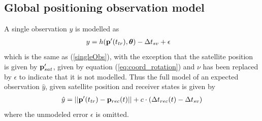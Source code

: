 \subsection{Global positioning observation model}
A single observation $y$ is modelled as 
\begin{align}
y&=h({\bf p}'(t_{tr}), {\boldsymbol \theta})-\Delta t_{sv}+\epsilon
\end{align}
which is the same as (\ref{singleObs}), with the exception that the satellite position is given by ${\bf p}'_{sat}$, given by equation (\ref{eq:coord_rotation}) and $\nu$ has been replaced by $\epsilon$ to indicate that it is not modelled. Thus the full model of an expected observation $\hat{y}$, given satellite position and receiver states is given by
\begin{align}\label{eq:obsModel}
\hat{y}=||{\bf p}'(t_{tr})-{\bf p}_{rec}(t)||+c\cdot(\Delta t_{rec}(t)-\Delta t_{sv})
\end{align}
where the unmodeled error $\epsilon$ is omitted.

